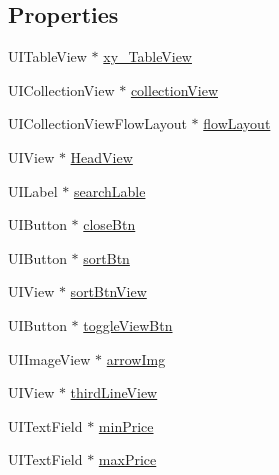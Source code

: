 \subsection*{Properties}
\begin{DoxyCompactItemize}
\item 
U\+I\+Table\+View $\ast$ \mbox{\hyperlink{category_product_list_view_controller_07_08_a49cfed60d3c9e715f855c22f39fc7771}{xy\+\_\+\+Table\+View}}
\item 
U\+I\+Collection\+View $\ast$ \mbox{\hyperlink{category_product_list_view_controller_07_08_a15c4a8b9252af5d33c8463cafcba8b4b}{collection\+View}}
\item 
U\+I\+Collection\+View\+Flow\+Layout $\ast$ \mbox{\hyperlink{category_product_list_view_controller_07_08_a24314dfd20cac196a7cf48980eca3ccf}{flow\+Layout}}
\item 
U\+I\+View $\ast$ \mbox{\hyperlink{category_product_list_view_controller_07_08_a982adbd90ec1c9fee92ed5ea43ee3545}{Head\+View}}
\item 
U\+I\+Label $\ast$ \mbox{\hyperlink{category_product_list_view_controller_07_08_a93614b143e0d1d61a488b5fc71608cf4}{search\+Lable}}
\item 
U\+I\+Button $\ast$ \mbox{\hyperlink{category_product_list_view_controller_07_08_a832b87b28201e7e937cc52bbc3166f79}{close\+Btn}}
\item 
U\+I\+Button $\ast$ \mbox{\hyperlink{category_product_list_view_controller_07_08_a782245853cf3ee2bdc04e689eb1f4f74}{sort\+Btn}}
\item 
U\+I\+View $\ast$ \mbox{\hyperlink{category_product_list_view_controller_07_08_ab5dad7cb6b5e01f7c24965ad94c67cc4}{sort\+Btn\+View}}
\item 
U\+I\+Button $\ast$ \mbox{\hyperlink{category_product_list_view_controller_07_08_a55b84dbb80cc8051c206fea3cabe21ab}{toggle\+View\+Btn}}
\item 
U\+I\+Image\+View $\ast$ \mbox{\hyperlink{category_product_list_view_controller_07_08_a6ef60515ff4a46c5f4cd7f74b000ae94}{arrow\+Img}}
\item 
U\+I\+View $\ast$ \mbox{\hyperlink{category_product_list_view_controller_07_08_a0094ba0ca545067b259f3fb84ad90277}{third\+Line\+View}}
\item 
U\+I\+Text\+Field $\ast$ \mbox{\hyperlink{category_product_list_view_controller_07_08_a4f203a702e0b48f01902707a106c0816}{min\+Price}}
\item 
U\+I\+Text\+Field $\ast$ \mbox{\hyperlink{category_product_list_view_controller_07_08_aa4e6e6bf98d8ebe154825c5cc844bd36}{max\+Price}}

\end{DoxyCompactItemize}
